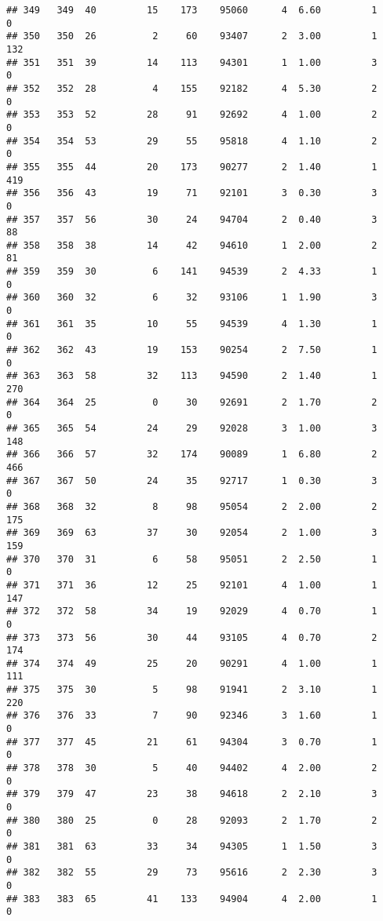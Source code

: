 \documentclass[
]{article}
\begin{document}
\begin{verbatim}
## 349   349  40         15    173    95060      4  6.60         1        0
## 350   350  26          2     60    93407      2  3.00         1      132
## 351   351  39         14    113    94301      1  1.00         3        0
## 352   352  28          4    155    92182      4  5.30         2        0
## 353   353  52         28     91    92692      4  1.00         2        0
## 354   354  53         29     55    95818      4  1.10         2        0
## 355   355  44         20    173    90277      2  1.40         1      419
## 356   356  43         19     71    92101      3  0.30         3        0
## 357   357  56         30     24    94704      2  0.40         3       88
## 358   358  38         14     42    94610      1  2.00         2       81
## 359   359  30          6    141    94539      2  4.33         1        0
## 360   360  32          6     32    93106      1  1.90         3        0
## 361   361  35         10     55    94539      4  1.30         1        0
## 362   362  43         19    153    90254      2  7.50         1        0
## 363   363  58         32    113    94590      2  1.40         1      270
## 364   364  25          0     30    92691      2  1.70         2        0
## 365   365  54         24     29    92028      3  1.00         3      148
## 366   366  57         32    174    90089      1  6.80         2      466
## 367   367  50         24     35    92717      1  0.30         3        0
## 368   368  32          8     98    95054      2  2.00         2      175
## 369   369  63         37     30    92054      2  1.00         3      159
## 370   370  31          6     58    95051      2  2.50         1        0
## 371   371  36         12     25    92101      4  1.00         1      147
## 372   372  58         34     19    92029      4  0.70         1        0
## 373   373  56         30     44    93105      4  0.70         2      174
## 374   374  49         25     20    90291      4  1.00         1      111
## 375   375  30          5     98    91941      2  3.10         1      220
## 376   376  33          7     90    92346      3  1.60         1        0
## 377   377  45         21     61    94304      3  0.70         1        0
## 378   378  30          5     40    94402      4  2.00         2        0
## 379   379  47         23     38    94618      2  2.10         3        0
## 380   380  25          0     28    92093      2  1.70         2        0
## 381   381  63         33     34    94305      1  1.50         3        0
## 382   382  55         29     73    95616      2  2.30         3        0
## 383   383  65         41    133    94904      4  2.00         1        0

\end{verbatim}
\end{document}
